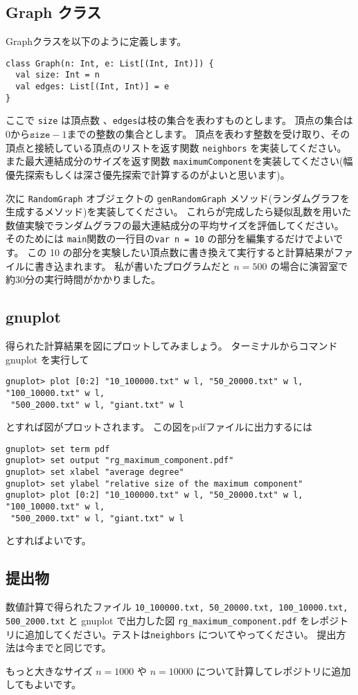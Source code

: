 \documentclass[a4paper,twoside,onecolumn,openany,article]{memoir}
\theoremstyle{remark}
\begin{document}
\subsection{Graph クラス}
Graphクラスを以下のように定義します。
\begin{verbatim}
class Graph(n: Int, e: List[(Int, Int)]) {
  val size: Int = n
  val edges: List[(Int, Int)] = e
}
\end{verbatim}
ここで \texttt{size} は頂点数 、\texttt{edges}は枝の集合を表わすものとします。
頂点の集合は0から$\mathtt{size}-1$までの整数の集合とします。
頂点を表わす整数を受け取り、その頂点と接続している頂点のリストを返す関数 \texttt{neighbors} を実装してください。
また最大連結成分のサイズを返す関数 \texttt{maximumComponent}を実装してください(幅優先探索もしくは深さ優先探索で計算するのがよいと思います)。

次に \texttt{RandomGraph} オブジェクトの \texttt{genRandomGraph} メソッド(ランダムグラフを生成するメソッド)を実装してください。
これらが完成したら疑似乱数を用いた数値実験でランダムグラフの最大連結成分の平均サイズを評価してください。
そのためには \texttt{main}関数の一行目の\texttt{var n = 10} の部分を編集するだけでよいです。
この 10 の部分を実験したい頂点数に書き換えて実行すると計算結果がファイルに書き込まれます。
私が書いたプログラムだと $n=500$ の場合に演習室で約30分の実行時間がかかりました。

\subsection{gnuplot}
得られた計算結果を図にプロットしてみましょう。
ターミナルからコマンド gnuplot を実行して
\begin{verbatim}
gnuplot> plot [0:2] "10_100000.txt" w l, "50_20000.txt" w l, "100_10000.txt" w l,
 "500_2000.txt" w l, "giant.txt" w l
\end{verbatim}
とすれば図がプロットされます。
この図をpdfファイルに出力するには
\begin{verbatim}
gnuplot> set term pdf
gnuplot> set output "rg_maximum_component.pdf"
gnuplot> set xlabel "average degree"
gnuplot> set ylabel "relative size of the maximum component"
gnuplot> plot [0:2] "10_100000.txt" w l, "50_20000.txt" w l, "100_10000.txt" w l,
 "500_2000.txt" w l, "giant.txt" w l
\end{verbatim}
とすればよいです。

\subsection{提出物}
数値計算で得られたファイル
\texttt{10\_100000.txt, 50\_20000.txt, 100\_10000.txt, 500\_2000.txt}
と gnuplot で出力した図 \texttt{rg\_maximum\_component.pdf}
をレポジトリに追加してください。テストは\texttt{neighbors} についてやってください。
提出方法は今までと同じです。

もっと大きなサイズ $n= 1000$ や $n=10000$ について計算してレポジトリに追加してもよいです。
\end{document}
